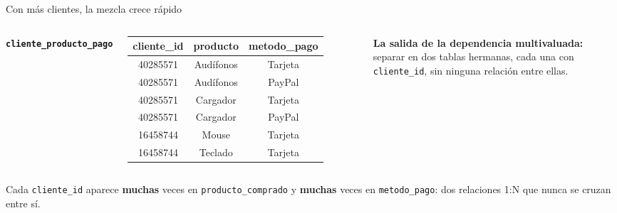 \documentclass[aspectratio=169,10pt,c]{beamer}
\newcommand{\tbl}[1]{\textcolor{utpNaranja}{\texttt{#1}}}
\newcommand{\tblb}[1]{\textcolor{utpNaranja}{\textbf{\texttt{#1}}}}
\begin{document}
\begin{frame}{Con más clientes, la mezcla crece rápido}
\vspace{0.15cm}
\begin{columns}[T,onlytextwidth]
\scriptsize\centering\tblb{cliente\_producto\_pago}\\[2pt]
\begin{tabular}{ccc}
\toprule
\bfseries cliente\_id & \bfseries producto & \bfseries metodo\_pago \\
\midrule
40285571 & Audífonos & Tarjeta \\
40285571 & Audífonos & PayPal \\
40285571 & Cargador  & Tarjeta \\
40285571 & Cargador  & PayPal \\
16458744 & Mouse     & Tarjeta \\
16458744 & Teclado   & Tarjeta \\
\bottomrule
\end{tabular}
\small \textbf{La salida de la dependencia multivaluada:} separar en dos tablas hermanas, cada una con \texttt{cliente\_id}, sin ninguna relación entre ellas.
\vspace{0.15cm}
\begin{center}
\end{center}
\end{columns}
\vspace{0.2cm}
\small Cada \texttt{cliente\_id} aparece \textbf{muchas} veces en \tbl{producto\_comprado} y \textbf{muchas} veces en \tbl{metodo\_pago}: dos relaciones 1:N que nunca se cruzan entre sí.
\end{frame}
\end{document}
